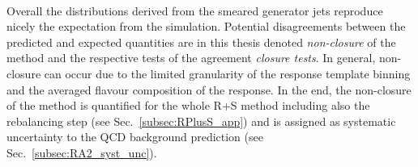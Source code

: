 \begin{description}
\begin{figure}[!t]
  \label{fig:qcd_rs_genjets}
\end{figure}
\\
Overall the distributions derived from the smeared generator jets reproduce nicely the expectation from the simulation. Potential disagreements between the predicted and expected quantities are in this thesis denoted \textit{non-closure} of the method and the respective tests of the agreement \textit{closure tests}. In general, non-closure can occur due to the limited granularity of the response template binning and the averaged flavour composition of the response. In the end, the non-closure of the method is quantified for the whole R+S method including also the rebalancing step (see Sec.~\ref{subsec:RPlusS_app}) and is assigned as systematic uncertainty to the QCD background prediction (see Sec.~\ref{subsec:RA2_syst_unc}). 
\end{description}
